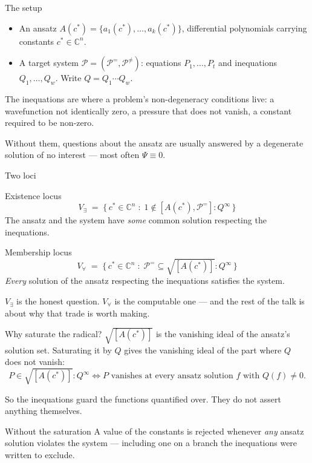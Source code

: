 \documentclass[10pt,aspectratio=169]{beamer}
\newcommand{\Pset}{\mathcal{P}}
\newcommand{\Peq}{\mathcal{P}^{=}}
\newcommand{\Pne}{\mathcal{P}^{\neq}}
\newcommand{\C}{\mathbb{C}}
\newcommand{\cstar}{c^{*}}
\begin{document}
\begin{frame}{The setup}
\begin{itemize}
  \item An \alert{ansatz} $A(\cstar) = \{a_{1}(\cstar),\dots,a_{k}(\cstar)\}$,
        differential polynomials carrying constants $\cstar \in \C^{n}$.
  \item A \alert{target system} $\Pset = (\Peq, \Pne)$: equations
        $P_{1},\dots,P_{t}$ and inequations $Q_{1},\dots,Q_{w}$.
        Write $Q = Q_{1}\cdots Q_{w}$.
\end{itemize}

\pause
\medskip
The inequations are where a problem's \alert{non-degeneracy} conditions live: a
wavefunction not identically zero, a pressure that does not vanish, a constant
required to be non-zero.

\pause
\bigskip
\begin{alertblock}{}
Without them, questions about the ansatz are usually answered by a degenerate
solution of no interest --- most often $\Psi \equiv 0$.
\end{alertblock}
\end{frame}

\begin{frame}{Two loci}
\begin{block}{Existence locus}
\[
  V_{\exists} \;=\;
  \{\, \cstar \in \C^{n} \;:\; 1 \notin [A(\cstar), \Peq] : Q^{\infty} \,\}
\]
The ansatz and the system have \emph{some} common solution respecting the
inequations.
\end{block}

\pause
\begin{block}{Membership locus}
\[
  V_{\forall} \;=\;
  \{\, \cstar \in \C^{n} \;:\; \Peq \subseteq \sqrt{[A(\cstar)]} : Q^{\infty} \,\}
\]
\emph{Every} solution of the ansatz respecting the inequations satisfies the
system.
\end{block}

\pause
\medskip
$V_{\exists}$ is the honest question. $V_{\forall}$ is the computable one --- and
the rest of the talk is about why that trade is worth making.
\end{frame}

\begin{frame}{Why saturate the radical?}
$\sqrt{[A(\cstar)]}$ is the vanishing ideal of the ansatz's solution set. Saturating
it by $Q$ gives the vanishing ideal of the part where $Q$ does not vanish:
\[
  P \in \sqrt{[A(\cstar)]} : Q^{\infty}
  \iff
  \text{$P$ vanishes at every ansatz solution $f$ with $Q(f) \neq 0$.}
\]

\pause
\medskip
So the inequations \alert{guard} the functions quantified over. They do not assert
anything themselves.

\pause
\begin{alertblock}{Without the saturation}
A value of the constants is rejected whenever \emph{any} ansatz solution violates
the system --- including one on a branch the inequations were written to exclude.
\end{alertblock}
\end{frame}
\end{document}
